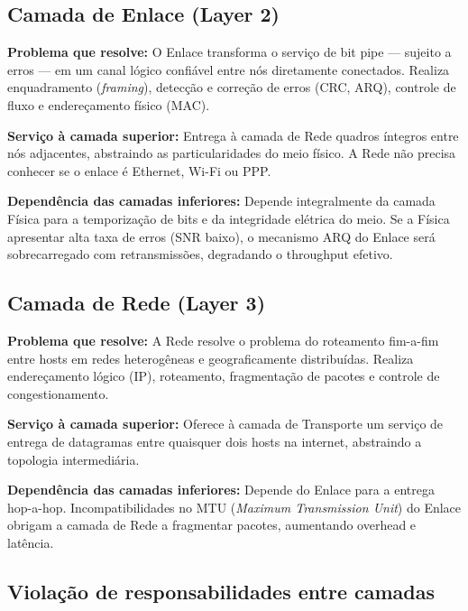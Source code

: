 \documentclass[conference]{IEEEtran}
\begin{document}
\subsection*{Camada de Enlace (Layer 2)}

\textbf{Problema que resolve:} O Enlace transforma o serviço de bit pipe --- sujeito a erros ---
em um canal lógico confiável entre nós diretamente conectados. Realiza enquadramento
(\textit{framing}), detecção e correção de erros (CRC, ARQ), controle de fluxo e endereçamento
físico (MAC).

\textbf{Serviço à camada superior:} Entrega à camada de Rede quadros íntegros entre nós
adjacentes, abstraindo as particularidades do meio físico. A Rede não precisa conhecer se o
enlace é Ethernet, Wi-Fi ou PPP.

\textbf{Dependência das camadas inferiores:} Depende integralmente da camada Física para a
temporização de bits e da integridade elétrica do meio. Se a Física apresentar alta taxa de
erros (SNR baixo), o mecanismo ARQ do Enlace será sobrecarregado com retransmissões, degradando
o throughput efetivo.

\subsection*{Camada de Rede (Layer 3)}

\textbf{Problema que resolve:} A Rede resolve o problema do roteamento fim-a-fim entre hosts
em redes heterogêneas e geograficamente distribuídas. Realiza endereçamento lógico (IP),
roteamento, fragmentação de pacotes e controle de congestionamento.

\textbf{Serviço à camada superior:} Oferece à camada de Transporte um serviço de entrega de
datagramas entre quaisquer dois hosts na internet, abstraindo a topologia intermediária.

\textbf{Dependência das camadas inferiores:} Depende do Enlace para a entrega hop-a-hop.
Incompatibilidades no MTU (\textit{Maximum Transmission Unit}) do Enlace obrigam a camada
de Rede a fragmentar pacotes, aumentando overhead e latência.

\subsection*{Violação de responsabilidades entre camadas}
\end{document}

